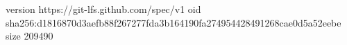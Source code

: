 version https://git-lfs.github.com/spec/v1
oid sha256:d1816870d3aefb88f267277fda3b164190fa274954428491268cae0d5a52eebe
size 209490
